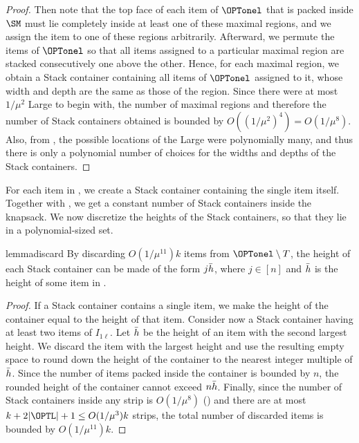 \begin{proof}
    
    Then note that the top face of each item of $\OPTonel$ that is packed inside $\SM$ must lie completely inside at least one of these maximal regions, and we assign the item to one of these regions arbitrarily. Afterward, we permute the items of $\OPTonel$ so that all items assigned to a particular maximal region are stacked consecutively one above the other. Hence, for each maximal region, we obtain a Stack container containing all items of $\OPTonel$ assigned to it, whose width and depth are the same as those of the region. Since there were at most $1/\mu^2$ Large  to begin with, the number of maximal regions and therefore the number of Stack containers obtained is bounded by $O((1/\mu^2)^4) = O(1/\mu^8)$. Also, from , the possible locations of the Large  were polynomially many, and thus there is only a polynomial number of choices for the widths and depths of the Stack containers.
\end{proof}


For each item in , we create a Stack container containing the single item itself. Together with , we get a constant number of Stack containers inside the knapsack. We now discretize the heights of the Stack containers, so that they lie in a polynomial-sized set.

\begin{restatable}{lemma}{discard}
\label{lem:discard}
    By discarding $O(1/\mu^{11})k$ items from $\OPTonel\setminus T$, the height of each Stack container can be made of the form $j\Bar{h}$, where $j\in [n]$ and $\Bar{h}$ is the height of some item in .
\end{restatable}
\begin{proof}
If a Stack container contains a single item, we make the height of the container equal to the height of that item. Consider now a Stack container having at least two items of $I_{1\ell}$. Let $\Bar{h}$ be the height of an item with the second largest height. We discard the item with the largest height and use the resulting empty space to round down the height of the container to the nearest integer multiple of $\Bar{h}$. Since the number of items packed inside the container is bounded by $n$, the rounded height of the container cannot exceed $n\Bar{h}$. Finally, since the number of Stack containers inside any strip is $O(1/\mu^8)$ () and there are at most $k+2|\OPTL|+1 \le O(1/\mu^3)k$ strips, the total number of discarded items is bounded by $O(1/\mu^{11})k$.
\end{proof}


